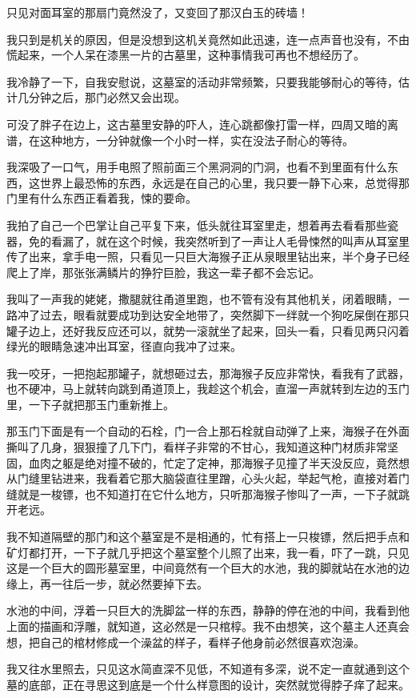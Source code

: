 只见对面耳室的那扇门竟然没了，又变回了那汉白玉的砖墙！

我只到是机关的原因，但是没想到这机关竟然如此迅速，连一点声音也没有，不由慌起来，一个人呆在漆黑一片的古墓里，这种事情我可再也不想经历了。

我冷静了一下，自我安慰说，这墓室的活动非常频繁，只要我能够耐心的等待，估计几分钟之后，那门必然又会出现。

可没了胖子在边上，这古墓里安静的吓人，连心跳都像打雷一样，四周又暗的离谱，在这种地方，一分钟就像一个小时一样，实在没法子耐心的等待。

我深吸了一口气，用手电照了照前面三个黑洞洞的门洞，也看不到里面有什么东西，这世界上最恐怖的东西，永远是在自己的心里，我只要一静下心来，总觉得那门里有什么东西正看着我，悚的要命。

我拍了自己一个巴掌让自己平复下来，低头就往耳室里走，想着再去看看那些瓷器，免的看漏了，就在这个时候，我突然听到了一声让人毛骨悚然的叫声从耳室里传了出来，拿手电一照，只看见一只巨大海猴子正从泉眼里钻出来，半个身子已经爬上了岸，那张张满鳞片的狰狞巨脸，我这一辈子都不会忘记。

我叫了一声我的姥姥，撒腿就往甬道里跑，也不管有没有其他机关，闭着眼睛，一路冲了过去，眼看就要成功到达安全地带了，突然脚下一绊就一个狗吃屎倒在那只罐子边上，还好我反应还可以，就势一滚就坐了起来，回头一看，只看见两只闪着绿光的眼睛急速冲出耳室，径直向我冲了过来。

我一咬牙，一把抱起那罐子，就想砸过去，那海猴子反应非常快，看我有了武器，也不硬冲，马上就转向跳到甬道顶上，我趁这个机会，直溜一声就转到左边的玉门里，一下子就把那玉门重新推上。

那玉门下面是有一个自动的石栓，门一合上那石栓就自动弹了上来，海猴子在外面撕叫了几身，狠狠撞了几下门，看样子非常的不甘心，我知道这种门材质非常坚固，血肉之躯是绝对撞不破的，忙定了定神，那海猴子见撞了半天没反应，竟然想从门缝里钻进来，我看着它那大脑袋直往里蹭，心头火起，举起气枪，直接对着门缝就是一梭镖，也不知道打在它什么地方，只听那海猴子惨叫了一声，一下子就跳开老远。

我不知道隔壁的那门和这个墓室是不是相通的，忙有搭上一只梭镖，然后把手点和矿灯都打开，一下子就几乎把这个墓室整个儿照了出来，我一看，吓了一跳，只见这是一个巨大的圆形墓室里，中间竟然有一个巨大的水池，我的脚就站在水池的边缘上，再一往后一步，就必然要掉下去。

水池的中间，浮着一只巨大的洗脚盆一样的东西，静静的停在池的中间，我看到他上面的描画和浮雕，就知道，这必然是一只棺椁。我不由想笑，这个墓主人还真会想，把自己的棺材修成一个澡盆的样子，看样子他身前必然很喜欢泡澡。

我又往水里照去，只见这水简直深不见低，不知道有多深，说不定一直就通到这个墓的底部，正在寻思这到底是一个什么样意图的设计，突然就觉得脖子痒了起来。

